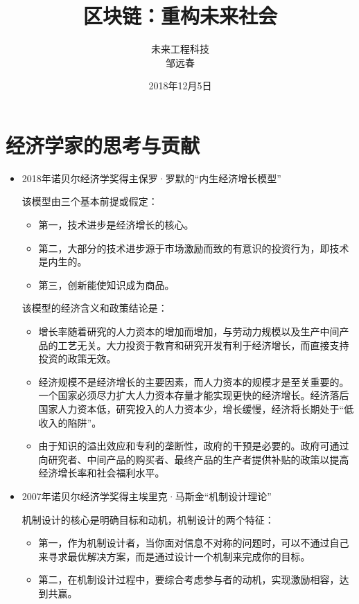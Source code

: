 \documentclass[UTF9]{ctexart}
\title{区块链：重构未来社会}
\date{2018年12月5日}
\author{未来工程科技\\邹远春}
\begin{document}
\maketitle

\newcommand\Emph{\textbf}

\tableofcontents

\section{经济学家的思考与贡献}

\begin{itemize}

\item 2018年诺贝尔经济学奖得主保罗·罗默的“内生经济增长模型”

该模型由三个基本前提或假定：
\begin{itemize}
\item 第一，技术进步是经济增长的核心。
\item 第二，大部分的技术进步源于市场激励而致的有意识的投资行为，即技术是内生的。
\item 第三，创新能使知识成为商品。
\end{itemize}

该模型的经济含义和政策结论是：

\begin{itemize}
\item 增长率随着研究的人力资本的增加而增加，与劳动力规模以及生产中间产品的工艺无关。大力投资于教育和研究开发有利于经济增长，而直接支持投资的政策无效。

\item 经济规模不是经济增长的主要因素，而人力资本的规模才是至关重要的。一个国家必须尽力扩大人力资本存量才能实现更快的经济增长。经济落后国家人力资本低，研究投入的人力资本少，增长缓慢，经济将长期处于“低收入的陷阱”。

\item 由于知识的溢出效应和专利的垄断性，政府的干预是必要的。政府可通过向研究者、中间产品的购买者、最终产品的生产者提供补贴的政策以提高经济增长率和社会福利水平。
\end{itemize}

\item 2007年诺贝尔经济学奖得主埃里克·马斯金“机制设计理论”

机制设计的核心是明确目标和动机，机制设计的两个特征：
\begin{itemize}
\item 第一，作为机制设计者，当你面对信息不对称的问题时，可以不通过自己来寻求最优解决方案，而是通过设计一个机制来完成你的目标。
\item 第二，在机制设计过程中，要综合考虑参与者的动机，实现激励相容，达到共赢。
\end{itemize}


\end{itemize}
\end{document}
